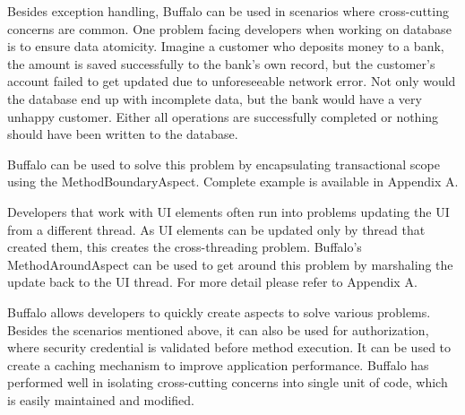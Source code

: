 Besides exception handling, Buffalo can be used in scenarios where cross-cutting concerns are common. One problem facing developers when working on database is to ensure data atomicity. Imagine a customer who deposits money to a bank, the amount is saved successfully to the bank’s own record, but the customer’s account failed to get updated due to unforeseeable network error. Not only would the database end up with incomplete data, but the bank would have a very unhappy customer. Either all operations are successfully completed or nothing should have been written to the database.

Buffalo can be used to solve this problem by encapsulating transactional scope using the MethodBoundaryAspect. Complete example is available in Appendix A.

Developers that work with UI elements often run into problems updating the UI from a different thread. As UI elements can be updated only by thread that created them, this creates the cross-threading problem. Buffalo’s MethodAroundAspect can be used to get around this problem by marshaling the update back to the UI thread. For more detail please refer to Appendix A.

Buffalo allows developers to quickly create aspects to solve various problems. Besides the scenarios mentioned above, it can also be used for authorization, where security credential is validated before method execution. It can be used to create a caching mechanism to improve application performance. Buffalo has performed well in isolating cross-cutting concerns into single unit of code, which is easily maintained and modified.
